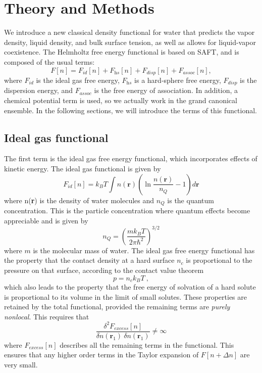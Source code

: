 \documentclass[letterpaper,twocolumn,amsmath,amssymb,prb]{revtex4-1}
\newcommand{\xx}{\textbf{r}}
\begin{document}
\section{Theory and Methods}
We introduce a new classical density functional for water that
predicts the vapor density, liquid density, and bulk surface tension, as well 
as allows for liquid-vapor coexistence.  The Helmholtz free energy functional is
based on SAFT, and is composed of the usual terms:
\begin{equation}
  F[n] = F_\textit{id}[n] + F_\textit{hs}[n]  +
F_\textit{disp}[n]+ F_\textit{assoc}[n],
\end{equation}
where $F_\textit{id}$ is the ideal gas free energy, $F_\textit{hs}$ is
a hard-sphere free energy, $F_\textit{disp}$ is the dispersion energy,
and $F_\textit{assoc}$ is the free energy of association.  In
addition, a chemical potential term is used, so we actually work in
the grand canonical ensemble.  In the following sections, we will
introduce the terms of this functional.

\subsection{Ideal gas functional}
The first term is the ideal gas free energy functional,
which incorporates effects of kinetic energy.  The ideal gas
functional is given by
\begin{equation}\label{idealgas}
  F_{id}[n] = k_B T \int n(\xx)\left( \ln{\frac{n(\xx)}{n_Q}} - 1\right) d\xx
\end{equation}
where n(\xx) is the density of water molecules and $n_Q$ is the quantum 
concentration. This is the particle concentration where quantum effects
become appreciable and is given by
\begin{equation}\label{quantumconcentration}
 n_Q =\left(\frac{mk_BT}{2\pi\hbar^2}\right)^{3/2}
\end{equation}
where $m$ is the molecular mass of water. The ideal gas free
energy functional has the property that the contact density at a hard
surface $n_c$ is proportional to the pressure on that surface,
according to the contact value theorem
\begin{equation}\label{contactvaluethm}
  p = n_c k_BT \:,
\end{equation}
which also leads to the property that the free energy of solvation of
a hard solute is proportional to its volume in the limit of small
solutes.  These properties are retained by the total functional,
provided the remaining terms are \emph{purely nonlocal}. This requires
that
\begin{equation}
 \frac{\delta^2F_{\textit{excess}}[n]}{\delta n(\xx_1)~\delta n(\xx_1)}\neq\infty
\end{equation}
where $F_{\textit{excess}}[n]$ describes all the remaining terms in the functional.
This ensures that any higher order terms in the Taylor expansion
of $F[n+\Delta n]$ are very small.
\end{document}
